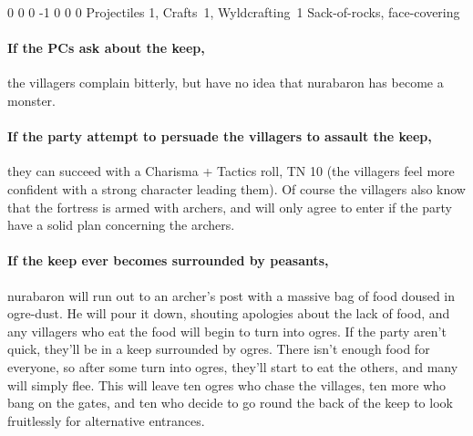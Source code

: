 {0}%
{0}%
{{0}%
{-1}%
{0}}%
{0}%
{0}%
{Projectiles 1, Crafts~1, Wyldcrafting~1}%
{Sack-of-rocks, face-covering}%
{}

\paragraph{If the PCs ask about the keep,}
the villagers complain bitterly, but have no idea that \gls{nurabaron} has become a monster.

\paragraph{If the party attempt to persuade the villagers to assault the keep,}
they can succeed with a Charisma + Tactics roll, TN 10
(the villagers feel more confident with a strong character leading them).
Of course the villagers also know that the fortress is armed with archers, and will only agree to enter if the party have a solid plan concerning the archers.

\paragraph{If the keep ever becomes surrounded by peasants,}
\gls{nurabaron} will run out to an archer's post with a massive bag of food doused in ogre-dust.
He will pour it down, shouting apologies about the lack of food, and any villagers who eat the food will begin to turn into ogres.
If the party aren't quick, they'll be in a keep surrounded by ogres.
There isn't enough food for everyone, so after some turn into ogres, they'll start to eat the others, and many will simply flee.
This will leave ten ogres who chase the villages, ten more who bang on the gates, and ten who decide to go round the back of the keep to look fruitlessly for alternative entrances.


